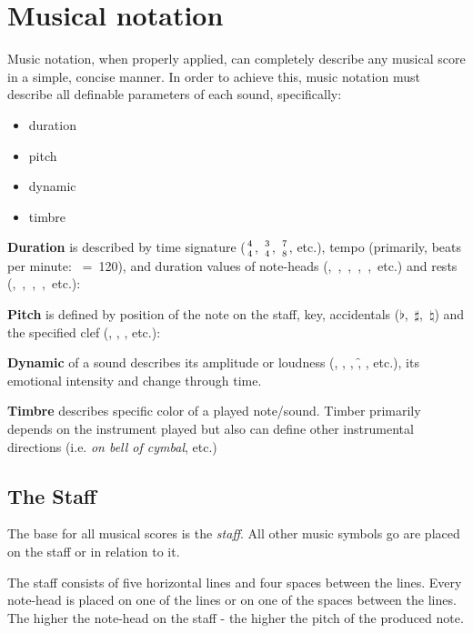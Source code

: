\chapter{Musical notation}\label{ch:music_notation}

Music notation, when properly applied, can completely describe any musical score in a simple, concise manner. In order
to achieve this, music notation must describe all definable parameters of each sound, specifically\cite{mcgrain1990music}:

\begin{itemize}
	\item duration
	\item pitch
	\item dynamic
	\item timbre
\end{itemize}

\textbf{Duration} is described by time signature ($4\atop4$, $3\atop4$, $7\atop8$, etc.), tempo (primarily, beats per
minute: \Vier~=~120), and duration values of note-heads (\Ganz,~\Halb,~\Vier,~\AAcht,~\Sech,~etc.) and rests
(\GaPa,~\ViPa,~\AcPa,~\SePa,~etc.):

\figcenter{}


\textbf{Pitch} is defined by position of the note on the staff, key, accidentals ($\flat$,~$\sharp$,~$\natural$) and
the specified clef (\inlinemusic\smalltrebleclef, \inlinemusic\smallbassclef, \inlinemusic\smallaltoclef, etc.):

\figcenter{}


\textbf{Dynamic} of a sound describes its amplitude or loudness (\pp, \p, \mf, \f, \ff, etc.), its emotional intensity
and change through time.

\textbf{Timbre} describes specific color of a played note/sound. Timber primarily depends on the instrument played but
also can define other instrumental directions (i.e. \textit{on bell of cymbal}, etc.)


\section{The Staff}\label{sec:the_staff}
The base for all musical scores is the \textit{staff}. All other music symbols go are placed on the staff or in relation
to it.

The staff consists of five horizontal lines and four spaces between the lines. Every note-head is placed on one of
the lines or on one of the spaces between the lines. The higher the note-head on the staff - the higher the pitch of
the produced note.

